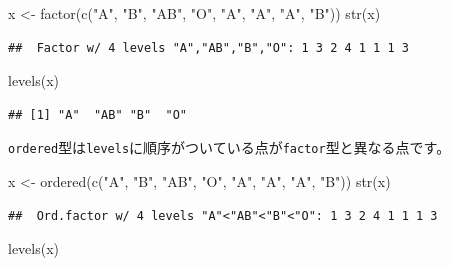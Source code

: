 \documentclass[
  12pt,
]{book}
\newenvironment{Shaded}{\begin{snugshade}}{\end{snugshade}}
\newcommand{\FunctionTok}[1]{\textcolor[rgb]{0.00,0.00,0.00}{#1}}
\newcommand{\NormalTok}[1]{#1}
\newcommand{\OtherTok}[1]{\textcolor[rgb]{0.56,0.35,0.01}{#1}}
\newcommand{\StringTok}[1]{\textcolor[rgb]{0.31,0.60,0.02}{#1}}
\begin{document}
\begin{Shaded}
\begin{Highlighting}[]
\NormalTok{x }\OtherTok{\textless{}{-}} \FunctionTok{factor}\NormalTok{(}\FunctionTok{c}\NormalTok{(}\StringTok{"A"}\NormalTok{, }\StringTok{"B"}\NormalTok{, }\StringTok{"AB"}\NormalTok{, }\StringTok{"O"}\NormalTok{, }\StringTok{"A"}\NormalTok{, }\StringTok{"A"}\NormalTok{, }\StringTok{"A"}\NormalTok{, }\StringTok{"B"}\NormalTok{))}
\FunctionTok{str}\NormalTok{(x)}
\end{Highlighting}
\end{Shaded}

\begin{verbatim}
##  Factor w/ 4 levels "A","AB","B","O": 1 3 2 4 1 1 1 3
\end{verbatim}

\begin{Shaded}
\begin{Highlighting}[]
\FunctionTok{levels}\NormalTok{(x)}
\end{Highlighting}
\end{Shaded}

\begin{verbatim}
## [1] "A"  "AB" "B"  "O"
\end{verbatim}

\texttt{ordered}型は\texttt{levels}に順序がついている点が\texttt{factor}型と異なる点です。

\begin{Shaded}
\begin{Highlighting}[]
\NormalTok{x }\OtherTok{\textless{}{-}} \FunctionTok{ordered}\NormalTok{(}\FunctionTok{c}\NormalTok{(}\StringTok{"A"}\NormalTok{, }\StringTok{"B"}\NormalTok{, }\StringTok{"AB"}\NormalTok{, }\StringTok{"O"}\NormalTok{, }\StringTok{"A"}\NormalTok{, }\StringTok{"A"}\NormalTok{, }\StringTok{"A"}\NormalTok{, }\StringTok{"B"}\NormalTok{))}
\FunctionTok{str}\NormalTok{(x)}
\end{Highlighting}
\end{Shaded}

\begin{verbatim}
##  Ord.factor w/ 4 levels "A"<"AB"<"B"<"O": 1 3 2 4 1 1 1 3
\end{verbatim}

\begin{Shaded}
\begin{Highlighting}[]
\FunctionTok{levels}\NormalTok{(x)}
\end{Highlighting}
\end{Shaded}
\end{document}
